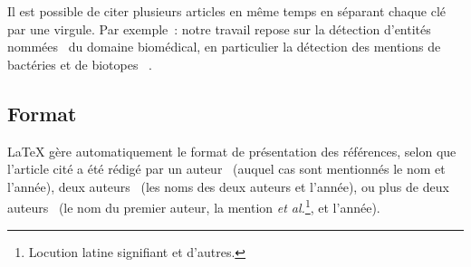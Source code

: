 Il est possible de citer plusieurs articles en même temps en séparant
chaque clé par une virgule. Par exemple~: notre travail repose sur la
détection d'entités nommées~%
du
domaine biomédical, en particulier la détection des mentions de
bactéries et de biotopes~%
.


\subsection{Format}
\LaTeX{} gère automatiquement le format de présentation des
références, selon que l'article cité a été rédigé par un
auteur~%
(auquel cas sont mentionnés le nom et
l'année), deux auteurs~%
(les noms des deux
auteurs et l'année), ou plus de deux auteurs~%
(le
nom du premier auteur, la mention \emph{et al.}\footnote{Locution
  latine signifiant \og{}et d'autres\fg{}.}, et l'année).

